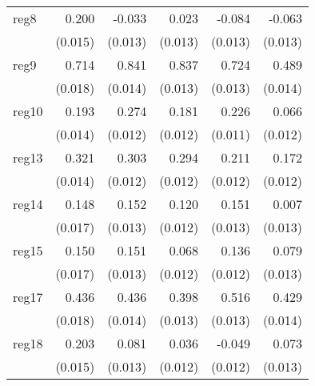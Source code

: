 {\begin{longtable}{l*{5}{D{.}{.}{-1}}}
\addlinespace
reg8        &       0.200\sym{***}&      -0.033\sym{**} &       0.023         &      -0.084\sym{***}&      -0.063\sym{***}\\
            &     (0.015)         &     (0.013)         &     (0.013)         &     (0.013)         &     (0.013)         \\
\addlinespace
reg9        &       0.714\sym{***}&       0.841\sym{***}&       0.837\sym{***}&       0.724\sym{***}&       0.489\sym{***}\\
            &     (0.018)         &     (0.014)         &     (0.013)         &     (0.013)         &     (0.014)         \\
\addlinespace
reg10       &       0.193\sym{***}&       0.274\sym{***}&       0.181\sym{***}&       0.226\sym{***}&       0.066\sym{***}\\
            &     (0.014)         &     (0.012)         &     (0.012)         &     (0.011)         &     (0.012)         \\
\addlinespace
reg13       &       0.321\sym{***}&       0.303\sym{***}&       0.294\sym{***}&       0.211\sym{***}&       0.172\sym{***}\\
            &     (0.014)         &     (0.012)         &     (0.012)         &     (0.012)         &     (0.012)         \\
\addlinespace
reg14       &       0.148\sym{***}&       0.152\sym{***}&       0.120\sym{***}&       0.151\sym{***}&       0.007         \\
            &     (0.017)         &     (0.013)         &     (0.012)         &     (0.013)         &     (0.013)         \\
\addlinespace
reg15       &       0.150\sym{***}&       0.151\sym{***}&       0.068\sym{***}&       0.136\sym{***}&       0.079\sym{***}\\
            &     (0.017)         &     (0.013)         &     (0.012)         &     (0.012)         &     (0.013)         \\
\addlinespace
reg17       &       0.436\sym{***}&       0.436\sym{***}&       0.398\sym{***}&       0.516\sym{***}&       0.429\sym{***}\\
            &     (0.018)         &     (0.014)         &     (0.013)         &     (0.013)         &     (0.014)         \\
\addlinespace
reg18       &       0.203\sym{***}&       0.081\sym{***}&       0.036\sym{**} &      -0.049\sym{***}&       0.073\sym{***}\\
            &     (0.015)         &     (0.013)         &     (0.012)         &     (0.012)         &     (0.013)         \\

\end{longtable}}
